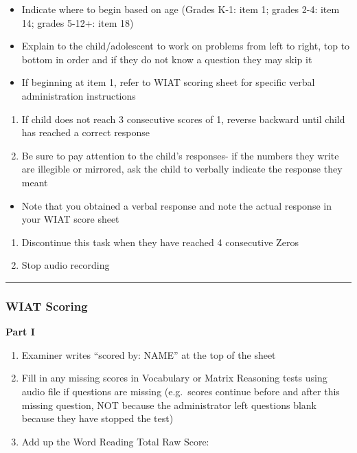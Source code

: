 \documentclass[]{book}
\providecommand{\tightlist}{%
  \setlength{\itemsep}{0pt}\setlength{\parskip}{0pt}}
\begin{document}
\begin{itemize}
\tightlist
\item
  Indicate where to begin based on age (Grades K-1: item 1; grades 2-4:
  item 14; grades 5-12+: item 18)
\item
  Explain to the child/adolescent to work on problems from left to
  right, top to bottom in order and if they do not know a question they
  may skip it
\item
  If beginning at item 1, refer to WIAT scoring sheet for specific
  verbal administration instructions
\end{itemize}

\begin{enumerate}
\def\labelenumi{\arabic{enumi}.}
\setcounter{enumi}{1}
\tightlist
\item
  If child does not reach 3 consecutive scores of 1, reverse backward
  until child has reached a correct response
\item
  Be sure to pay attention to the child's responses- if the numbers they
  write are illegible or mirrored, ask the child to verbally indicate
  the response they meant
\end{enumerate}

\begin{itemize}
\tightlist
\item
  Note that you obtained a verbal response and note the actual response
  in your WIAT score sheet
\end{itemize}

\begin{enumerate}
\def\labelenumi{\arabic{enumi}.}
\setcounter{enumi}{3}
\tightlist
\item
  Discontinue this task when they have reached 4 consecutive Zeros
\item
  Stop audio recording
\end{enumerate}

\begin{center}\rule{0.5\linewidth}{0.5pt}\end{center}

\subsubsection{WIAT Scoring}\label{wiat-scoring}

\textbf{Part I}

\begin{enumerate}
\def\labelenumi{\arabic{enumi}.}
\tightlist
\item
  Examiner writes ``scored by: NAME'' at the top of the sheet
\item
  Fill in any missing scores in Vocabulary or Matrix Reasoning tests
  using audio file if questions are missing (e.g.~scores continue before
  and after this missing question, NOT because the administrator left
  questions blank because they have stopped the test)
\item
  Add up the Word Reading Total Raw Score:
\end{enumerate}
\end{document}
